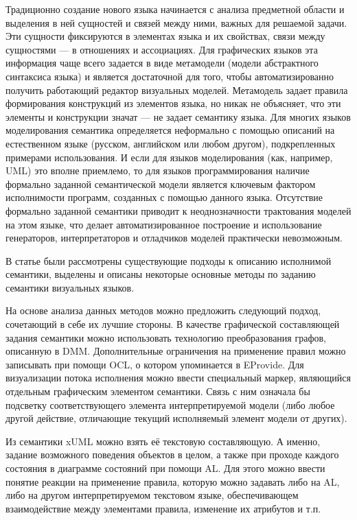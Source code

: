 \documentclass[a5paper]{article}
\begin{document}
Традиционно создание нового языка начинается с анализа предметной области и выделения в ней сущностей и связей между ними, важных для решаемой задачи. Эти сущности фиксируются в элементах языка и их свойствах, связи между сущностями --- в отношениях и ассоциациях. Для графических языков эта информация чаще всего задается в виде метамодели (модели абстрактного синтаксиса языка) и является достаточной для того, чтобы автоматизированно получить работающий редактор визуальных моделей. Метамодель задает правила формирования конструкций из элементов языка, но никак не объясняет, что эти элементы и конструкции значат — не задает семантику языка. Для многих языков моделирования семантика определяется неформально с помощью описаний на естественном языке (русском, английском или любом другом), подкрепленных примерами использования. И если для языков моделирования (как, например, UML) это вполне приемлемо, то для языков программирования наличие формально заданной семантической модели является ключевым фактором 
исполнимости программ, созданных с помощью данного языка. Отсутствие формально заданной семантики приводит к неоднозначности трактования моделей на этом языке, что делает автоматизированное построение и использование генераторов, интерпретаторов и отладчиков моделей практически невозможным. 

В статье были рассмотрены существующие подходы к описанию исполнимой семантики, выделены и описаны некоторые основные методы по заданию семантики визуальных языков. 

На основе анализа данных методов можно предложить следующий подход, сочетающий в себе их лучшие стороны. В качестве графической составляющей задания семантики можно использовать технологию преобразования графов, описанную в DMM. Дополнительные ограничения на применение правил можно записывать при помощи OCL, о котором упоминается в EProvide. Для визуализации потока исполнения можно ввести специальный маркер, являющийся отдельным графическим элементом семантики. Связь с ним означала бы подсветку соответствующего элемента интерпретируемой модели (либо любое другой действие, отличающие текущий исполняемый элемент модели от других).

Из семантики xUML можно взять её текстовую составляющую. А именно, задание возможного поведения объектов в целом, а также при проходе каждого состояния в диаграмме состояний при помощи AL. Для этого можно ввести понятие реакции на применение правила, которую можно задавать либо на AL, либо на другом интерпретируемом текстовом языке, обеспечивающем взаимодействие между элементами правила, изменение их атрибутов и т.п.
\end{document}
